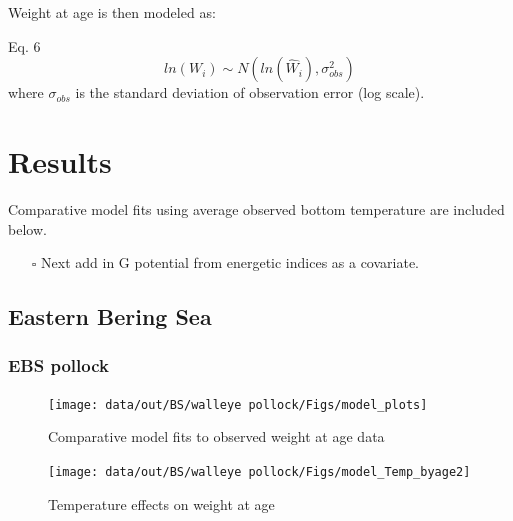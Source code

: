 \documentclass[
]{article}
\providecommand{\tightlist}{%
  \setlength{\itemsep}{0pt}\setlength{\parskip}{0pt}}
\begin{document}
Weight at age is then modeled as:

Eq. 6 \[ ln({W}_i) \sim N(ln(\hat{W}_i),\sigma^2_{obs})\] where
\(\sigma_{obs}\) is the standard deviation of observation error (log
scale).

\section{Results}\label{results}

Comparative model fits using average observed bottom temperature are
included below.

\begin{itemize}
\tightlist
\item[$\square$]
  Next add in G potential from energetic indices as a covariate.
\end{itemize}

\subsection{Eastern Bering Sea}\label{eastern-bering-sea}

\subsubsection{EBS pollock}\label{ebs-pollock}

\begin{figure}

{\centering \texttt{[image: data/out/BS/walleye pollock/Figs/model\_plots]} 

}

\caption{Comparative model fits to observed weight at age data}\label{fig:unnamed-chunk-2}
\end{figure}

\begin{figure}

{\centering \texttt{[image: data/out/BS/walleye pollock/Figs/model\_Temp\_byage2]} 

}

\caption{Temperature effects on weight at age}\label{fig:unnamed-chunk-3}
\end{figure}
\end{document}
